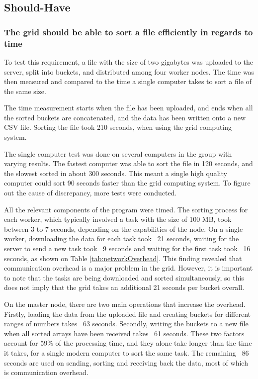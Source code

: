 \subsection{Should-Have}

\subsubsection{The grid should be able to sort a file efficiently in regards to time} \label{sssec:timeEfficient}
To test this requirement, a file with the size of two gigabytes was uploaded to the server, split into buckets, and distributed among four worker nodes. The time was then measured and compared to the time a single computer takes to sort a file of the same size.

The time measurement starts when the file has been uploaded, and ends when all the sorted buckets are concatenated, and the data has been written onto a new CSV file. Sorting the file took 210 seconds, when using the grid computing system.

The single computer test was done on several computers in the group with varying results. The fastest computer was able to sort the file in 120 seconds, and the slowest sorted in about 300 seconds. This meant a single high quality computer could sort 90 seconds faster than the grid computing system. To figure out the cause of discrepancy, more tests were conducted.

All the relevant components of the program were timed. The sorting process for each worker, which typically involved a task with the size of 100 MB, took between 3 to 7 seconds, depending on the capabilities of the node. On a single worker, downloading the data for each task took ~21 seconds, waiting for the server to send a new task took ~9 seconds and waiting for the first task took ~16 seconds, as shown on Table \ref{tab:networkOverhead}. This finding revealed that communication overhead is a major problem in the grid. However, it is important to note that the tasks are being downloaded and sorted simultaneously, so this does not imply that the grid takes an additional 21 seconds per bucket overall.

On the master node, there are two main operations that increase the overhead. Firstly, loading the data from the uploaded file and creating buckets for different ranges of numbers takes ~63 seconds. Secondly, writing the buckets to a new file when all sorted arrays have been received takes ~61 seconds. These two factors account for 59\% of the processing time, and they alone take longer than the time it takes, for a single modern computer to sort the same task. The remaining ~86 seconds are used on sending, sorting and receiving back the data, most of which is communication overhead.

